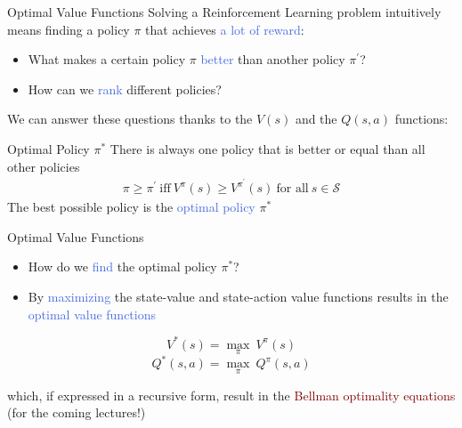 \documentclass{beamer}
\begin{document}
\begin{frame}{Optimal Value Functions}
	Solving a Reinforcement Learning problem intuitively means finding a policy $\pi$ that achieves \textcolor{RoyalBlue}{a lot of reward}:
	\begin{itemize}
		\item What makes a certain policy $\pi$ \textcolor{RoyalBlue}{better} than another policy $\pi^{\prime}$? 
		\item How can we \textcolor{RoyalBlue}{rank} different policies?
	\end{itemize}
	
	We can answer these questions thanks to the $V(s)$ and the $Q(s,a)$ functions:

	\begin{block}{Optimal Policy $\pi^*$}
		There is always one policy that is better or equal than all other policies
	\begin{align*}
		\pi \geq \pi^{\prime}\: \text{iff}\: V^{\pi}(s) \geq V^{\pi^{\prime}}(s) \: \text{for all}\: s\in\mathcal{S}
	\end{align*}
		The best possible policy is the \textcolor{RoyalBlue}{optimal policy} $\pi^{*}$
	\end{block}
\end{frame}


\begin{frame}{Optimal Value Functions}
	\begin{itemize}
		\item How do we \textcolor{RoyalBlue}{find} the optimal policy $\pi^{*}$?
		\item By \textcolor{RoyalBlue}{maximizing} the state-value and state-action value functions results in the \textcolor{RoyalBlue}{optimal value functions}
	\end{itemize}
	\begin{multicols}{2}
		\begin{equation*}
			V^{*}(s)=\underset{\pi}{\max}\:V^{\pi}(s)
		\end{equation*}\break
		\begin{equation*}
			Q^{*}(s,a)= \underset{\pi}{\max}\:Q^{\pi}(s,a)
		\end{equation*}
	\end{multicols}

	which, if expressed in a recursive form, result in the \textcolor{Maroon}{Bellman optimality equations} (for the coming lectures!) 

\end{frame}
\end{document}
